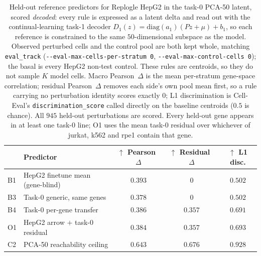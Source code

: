 \begin{table}[t]
\centering
\caption{Held-out reference predictors for Replogle HepG2 in the task-0
PCA-50 latent, scored \emph{decoded}: every rule is expressed as a latent
delta and read out with the continual-learning task-1 decoder
$D_1(z)=\mathrm{diag}(a_1)(Pz+\mu)+b_1$, so each reference is constrained to
the same $50$-dimensional subspace as the model.
Observed perturbed cells and the control pool are both kept whole, matching
\texttt{eval\_track} (\texttt{-{}-eval-max-cells-per-stratum 0},
\texttt{-{}-eval-max-control-cells 0}); the basal is every HepG2 non-test
control. These rules are centroids, so they do not sample $K$ model cells.
Macro Pearson~$\Delta$ is the mean per-stratum gene-space correlation;
residual Pearson~$\Delta$ removes each side's own pool mean first, so a rule
carrying no perturbation identity scores exactly $0$;
L1 discrimination is Cell-Eval's \texttt{discrimination\_score} called
directly on the baseline centroids ($0.5$ is chance).
All $945$ held-out perturbations are scored. Every held-out gene appears in
at least one task-0 line; O1 uses the mean task-0 residual over whichever of
jurkat, k562 and rpe1 contain that gene.}
\label{tab:replogle_heldout_baselines_pca50}
\setlength{\tabcolsep}{5pt}
\begin{tabular}{llccc}
\toprule
 & Predictor & $\uparrow$ Pearson~$\Delta$
 & $\uparrow$ Residual~$\Delta$ & $\uparrow$ L1 disc. \\
\midrule
B1 & HepG2 finetune mean (gene-blind)
 & $0.393$ & $0$ & $0.502$ \\
B3 & Task-0 generic, same genes
 & $0.378$ & $0$ & $0.502$ \\
B4 & Task-0 per-gene transfer
 & $0.386$ & $0.357$ & $0.691$ \\
O1 & HepG2 arrow $+$ task-0 residual
 & $0.384$ & $0.357$ & $0.693$ \\
C2 & PCA-50 reachability ceiling
 & $0.643$ & $0.676$ & $0.928$ \\
\bottomrule
\end{tabular}
\end{table}
